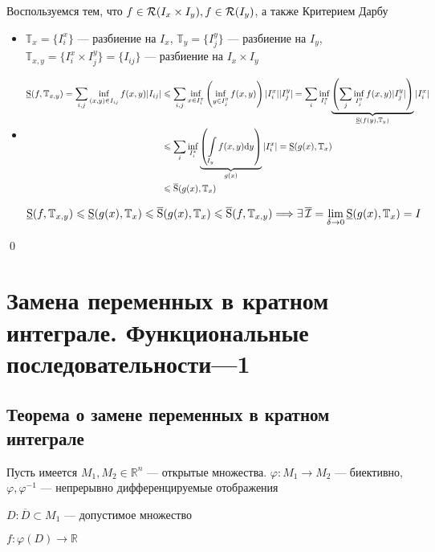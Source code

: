 \documentclass[a4paper, 10pt]{article}
\begin{document}
\proof Воспользуемся тем, что $f\in\mathcal{R}(I_x\times I_y),f\in\mathcal{R}(I_y)$, а также Критерием Дарбу
\begin{itemize}
    \item $\mathbb{T}_x=\{I_i^x\}$ — разбиение на $I_x$, $\mathbb{T}_y=\{I_j^y\}$ — разбиение на $I_y$, $\mathbb{T}_{x,y}=\{I_i^x\times I^y_j\}=\{I_{ij}\}$ — разбиение на $I_x\times I_y$
    \item \begin{equation*}
        \begin{aligned}
            \us(f,\mathbb{T}_{x,y})=\sum_{i,j} \inf\limits_{(x,y)\in I_{ij}} f(x,y)|I_{ij}|&\leqslant \sum_{i,j} \inf\limits_{x\in I_i^x} \left(\inf\limits_{y\in I_j^y} f(x,y)\right)|I_i^x||I_j^y|=\sum_i \inf\limits_{I^x_i} \underbrace{\left(\sum_j \inf\limits_{I^y_j} f(x,y)|I_j^y|\right)}_{\us(f(y), \mathbb{T}_y)}|I_i^x|\\
            &\leqslant \sum_i \inf\limits_{I^x_i}\underbrace{\left(\int\limits_{I_y} f(x,y)\d{y}\right)}_{g(x)}|I_i^x|=\us(g(x),\mathbb{T}_x)\\
            &\leqslant \os(g(x),\mathbb{T}_x)
        \end{aligned}
    \end{equation*}

    $\operatorname{\underline{S}}(f,\mathbb{T}_{x,y})\leqslant \operatorname{\underline{S}}(g(x),\mathbb{T}_x)\leqslant\operatorname{\overline{S}}(g(x), \mathbb{T}_x)\leqslant\operatorname{\overline{S}}(f,\mathbb{T}_{x,y})\Longrightarrow\exists \operatorname{\overline{\mathcal{I}}}=\lim\limits_{\delta\rightarrow0} \operatorname{\underline{S}}(g(x),\mathbb{T}_x)=I$
\end{itemize}\qed



\newpage
\section{Замена переменных в кратном интеграле. Функциональные последовательности—1}
\subsection{Теорема о замене переменных в кратном интеграле}
\theorem
Пусть имеется $M_1,M_2\in\mathbb{R}^n$ — открытые множества. $\varphi:M_1\longrightarrow M_2$ — биективно, $\varphi,\varphi^{-1}$ — непрерывно дифференцируемые отображения

$D:\overline{D}\subset M_1$ — допустимое множество

$f:\varphi(D)\longrightarrow\mathbb{R}$
\end{document}
